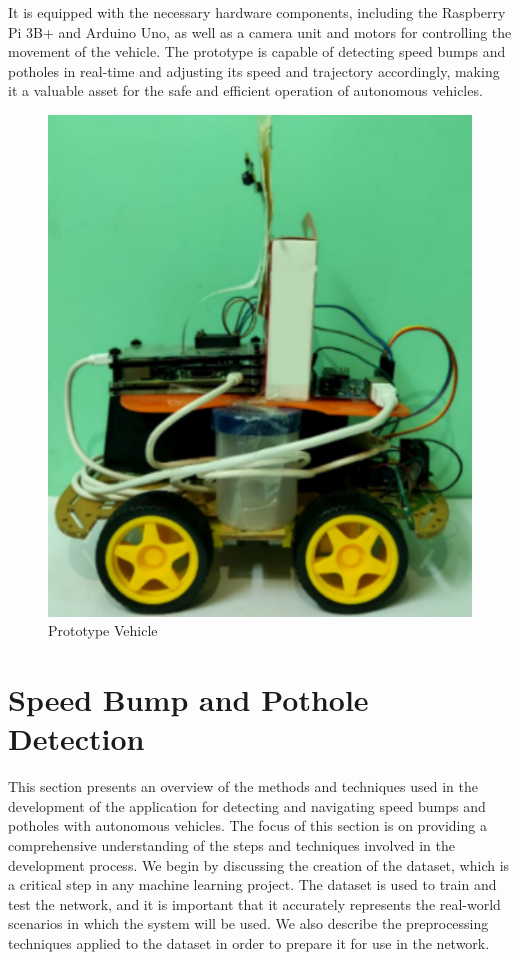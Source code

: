 \noindent
It is equipped with the necessary hardware components, including the Raspberry Pi 3B+ and Arduino Uno, as well as a camera unit and motors for controlling the movement of the vehicle. The prototype is capable of detecting speed bumps and potholes in real-time and adjusting its speed and trajectory accordingly, making it a valuable asset for the safe and efficient operation of autonomous vehicles.
\begin{figure}[H]
    \centering
    \includegraphics[scale=1]{Figures/chapter3/carconfig.png}
    \caption{Prototype Vehicle}
    \label{fig:carconfig}
\end{figure}


\section{Speed Bump and Pothole Detection}
This section presents an overview of the methods and techniques used in the development of the application for detecting and navigating speed bumps and potholes with autonomous vehicles. The focus of this section is on providing a comprehensive understanding of the steps and techniques involved in the development process.
\noindent
We begin by discussing the creation of the dataset, which is a critical step in any machine learning project. The dataset is used to train and test the network, and it is important that it accurately represents the real-world scenarios in which the system will be used. We also describe the preprocessing techniques applied to the dataset in order to prepare it for use in the network.

